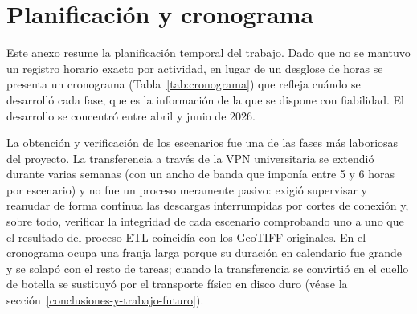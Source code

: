 \chapter{Planificación y cronograma}\label{anexo-f.-planificacion-y-esfuerzo}

Este anexo resume la planificación temporal del trabajo. Dado que no se mantuvo un registro horario exacto por actividad, en lugar de un desglose de horas se presenta un cronograma (Tabla~\ref{tab:cronograma}) que refleja cuándo se desarrolló cada fase, que es la información de la que se dispone con fiabilidad. El desarrollo se concentró entre abril y junio de 2026.

La obtención y verificación de los escenarios fue una de las fases más laboriosas del proyecto. La transferencia a través de la VPN universitaria se extendió durante varias semanas (con un ancho de banda que imponía entre 5 y 6 horas por escenario) y no fue un proceso meramente pasivo: exigió supervisar y reanudar de forma continua las descargas interrumpidas por cortes de conexión y, sobre todo, verificar la integridad de cada escenario comprobando uno a uno que el resultado del proceso ETL coincidía con los GeoTIFF originales. En el cronograma ocupa una franja larga porque su duración en calendario fue grande y se solapó con el resto de tareas; cuando la transferencia se convirtió en el cuello de botella se sustituyó por el transporte físico en disco duro (véase la sección~\ref{conclusiones-y-trabajo-futuro}).

